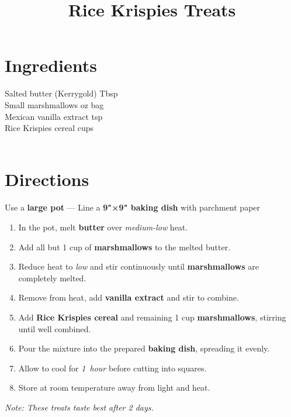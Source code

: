 \documentclass[11pt,letterpaper]{article}
\title{Rice Krispies Treats}
\author{}
\date{}
\begin{document}
\maketitle
\thispagestyle{empty}

\section*{Ingredients}
\setlength{\columnsep}{20pt}
\begin{multicols}{2}
\noindent
    Salted butter (Kerrygold)  Tbsp \\
    Small marshmallows  oz bag \\
    Mexican vanilla extract  tsp \\
    Rice Krispies cereal  cups \\
    \columnbreak
    \\
\end{multicols}

\section*{Directions}

\noindent
Use a \textbf{large pot} ---
Line a \textbf{9"×9" baking dish} with parchment paper

\begin{enumerate}
    \item In the pot, melt \textbf{butter} over \textit{medium-low} heat.
    \item Add all but 1 cup of \textbf{marshmallows} to the melted butter.
    \item Reduce heat to \textit{low} and stir continuously until \textbf{marshmallows} are completely melted.
    \item Remove from heat, add \textbf{vanilla extract} and stir to combine.
    \item Add \textbf{Rice Krispies cereal} and remaining 1 cup \textbf{marshmallows}, stirring until well combined.
    \item Pour the mixture into the prepared \textbf{baking dish}, spreading it evenly.
    \item Allow to cool for \textit{1~hour} before cutting into squares.
    \item Store at room temperature away from light and heat.
\end{enumerate}

\noindent
\textit{Note: These treats taste best after 2 days.}
\\
\end{document}
